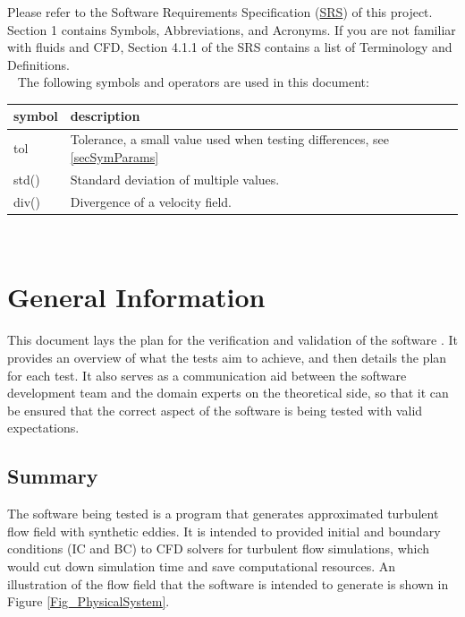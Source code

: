 \documentclass[12pt, titlepage]{article}
\begin{document}
Please refer to the Software Requirements Specification (\href{https://github.com/omltcat/turbulent-flow/blob/main/docs/SRS/SRS.pdf}{SRS}) of this project. Section 1 contains Symbols, Abbreviations, and Acronyms. If you are not familiar with fluids and CFD, Section 4.1.1 of the SRS contains a list of Terminology and Definitions.\\
~\newline
The following symbols and operators are used in this document:\\
\renewcommand{\arraystretch}{1.2}
\begin{tabular}{l l} 
  \toprule		
  \textbf{symbol} & \textbf{description}\\
  \midrule 
  tol & Tolerance, a small value used when testing differences, see \ref{secSymParams}\\
  std() & Standard deviation of multiple values.\\
  div() & Divergence of a velocity field.\\
  \bottomrule
\end{tabular}\\



\newpage


\section{General Information}

This document lays the plan for the verification and validation of the software \progname{}. It provides an overview of what the tests aim to achieve, and then details the plan for each test. It also serves as a communication aid between the software development team and the domain experts on the theoretical side, so that it can be ensured that the correct aspect of the software is being tested with valid expectations.

\subsection{Summary}

The software being tested is a program that generates approximated turbulent flow field with synthetic eddies. It is intended to provided initial and boundary conditions (IC and BC) to CFD solvers for turbulent flow simulations, which would cut down simulation time and save computational resources. An illustration of the flow field that the software is intended to generate is shown in Figure \ref{Fig_PhysicalSystem}.
\end{document}
